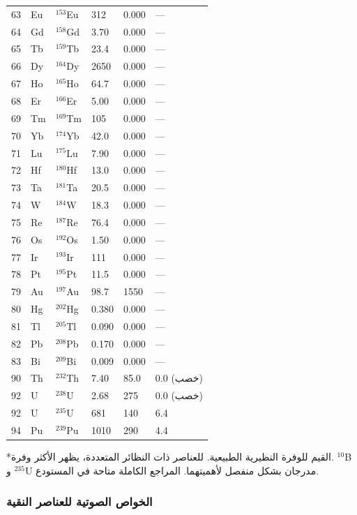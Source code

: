 \documentclass[11pt,a4paper]{article}
\begin{document}
\begin{otherlanguage}{arabic}
\begin{longtable}{p{0.8cm}p{1.2cm}p{2.0cm}p{2.5cm}p{2.5cm}p{2.5cm}}
			63 & Eu & \(^{153}\)Eu & 312 & 0.000 & --- \\
			64 & Gd & \(^{158}\)Gd & 3.70 & 0.000 & --- \\
			65 & Tb & \(^{159}\)Tb & 23.4 & 0.000 & --- \\
			66 & Dy & \(^{164}\)Dy & 2650 & 0.000 & --- \\
			67 & Ho & \(^{165}\)Ho & 64.7 & 0.000 & --- \\
			68 & Er & \(^{166}\)Er & 5.00 & 0.000 & --- \\
			69 & Tm & \(^{169}\)Tm & 105 & 0.000 & --- \\
			70 & Yb & \(^{174}\)Yb & 42.0 & 0.000 & --- \\
			71 & Lu & \(^{175}\)Lu & 7.90 & 0.000 & --- \\
			72 & Hf & \(^{180}\)Hf & 13.0 & 0.000 & --- \\
			73 & Ta & \(^{181}\)Ta & 20.5 & 0.000 & --- \\
			74 & W  & \(^{184}\)W & 18.3 & 0.000 & --- \\
			75 & Re & \(^{187}\)Re & 76.4 & 0.000 & --- \\
			76 & Os & \(^{192}\)Os & 1.50 & 0.000 & --- \\
			77 & Ir & \(^{193}\)Ir & 111 & 0.000 & --- \\
			78 & Pt & \(^{195}\)Pt & 11.5 & 0.000 & --- \\
			79 & Au & \(^{197}\)Au & 98.7 & 1550 & --- \\
			80 & Hg & \(^{202}\)Hg & 0.380 & 0.000 & --- \\
			81 & Tl & \(^{205}\)Tl & 0.090 & 0.000 & --- \\
			82 & Pb & \(^{208}\)Pb & 0.170 & 0.000 & --- \\
			83 & Bi & \(^{209}\)Bi & 0.009 & 0.000 & --- \\
			90 & Th & \(^{232}\)Th & 7.40 & 85.0 & 0.0 (خصب) \\
			92 & U  & \(^{238}\)U & 2.68 & 275 & 0.0 (خصب) \\
			92 & U  & \(^{235}\)U & 681 & 140 & 6.4 \\
			94 & Pu & \(^{239}\)Pu & 1010 & 290 & 4.4 \\
			\bottomrule
		\end{longtable}
		*القيم للوفرة النظيرية الطبيعية. للعناصر ذات النظائر المتعددة، يظهر الأكثر وفرة. \(^{10}\)B و \(^{235}\)U مدرجان بشكل منفصل لأهميتهما. المراجع الكاملة متاحة في المستودع.
		
		\subsubsection{الخواص الصوتية للعناصر النقية}
		\label{subsec:acoustic-properties-func}
		

\end{otherlanguage}
\end{document}
